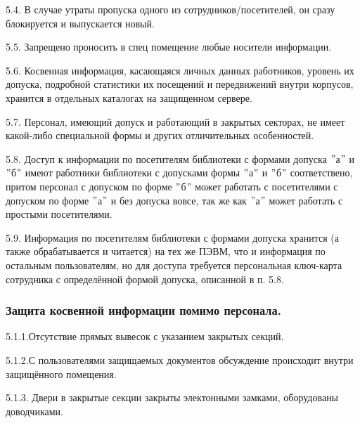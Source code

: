 \documentclass[utf8,14pt,a4paper,oneside,russian]{book}
\begin{document}
5.4. В случае утраты пропуска одного из сотрудников/посетителей,
он сразу блокируется и выпускается новый.

5.5. Запрещено проносить в спец помещение любые носители информации.

5.6. Косвенная информация, касающаяся личных данных работников, уровень их
допуска, подробной статистики их посещений и передвижений внутри корпусов,
хранится в отдельных каталогах на защищенном сервере.

5.7. Персонал, имеющий допуск и работающий в закрытых секторах, не имеет
какой-либо специальной формы и других отличительных особенностей.

5.8. Доступ к информации по посетителям библиотеки с формами допуска $"$а$"$ и $"$б$"$ имеют работники библиотеки с допусками формы
$"$а$"$ и $"$б$"$ соответствено, притом персонал с допуском по форме $"$б$"$ может работать с посетителями с допуском по форме $"$а$"$
и без допуска вовсе, так же как $"$а$"$ может работать с простыми посетителями.

5.9. Информация по посетителям библиотеки с формами допуска хранится (а также обрабатывается и читается) на тех же ПЭВМ, что и информация
по остальным пользователям, но для доступа требуется персональная ключ-карта сотрудника с определённой формой допуска, описанной в п. 5.8.

\newpage
\subsubsection{Защита косвенной информации помимо персонала.}

5.1.1.Отсутствие прямых вывесок с указанием закрытых секций.

5.1.2.С пользователями защищаемых документов обсуждение происходит
внутри защищённого помещения.

5.1.3. Двери в закрытые секции закрыты электонными замками, оборудованы
доводчиками.
\end{document}
